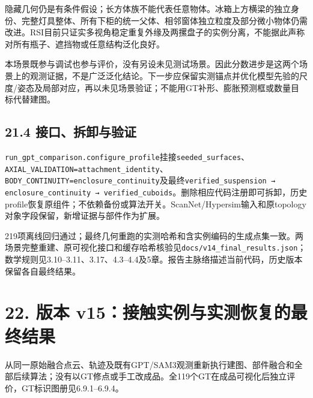 \documentclass[UTF8,fontset=fandol]{ctexart}
\begin{document}
隐藏几何仍是有条件假设；长方体族不能代表任意物体。冰箱上方横梁的独立身份、完整灯具整体、所有下柜的统一父体、相邻窗体独立粒度及部分微小物体仍需改进。RSI目前只证实多视角稳定重复外缘及两摞盘子的实例分离，不能据此声称对所有瓶子、遮挡物或任意结构泛化良好。



本场景既参与调试也参与评价，没有另设未见测试场景。因此分数进步是这两个场景上的观测证据，不是广泛泛化结论。下一步应保留实测锚点并优化模型先验的尺度/姿态及局部对应，再以未见场景验证；不能用GT补形、膨胀预测框或数量目标代替建图。



\subsection*{21.4 接口、拆卸与验证}

\texttt{run\_\allowbreak{}gpt\_\allowbreak{}comparison.\allowbreak{}configure\_\allowbreak{}profile}挂接\texttt{seeded\_\allowbreak{}surfaces}、\texttt{AXIAL\_\allowbreak{}VALIDATION=attachment\_\allowbreak{}identity}、\texttt{BODY\_\allowbreak{}CONTINUITY=enclosure\_\allowbreak{}continuity}及最终\texttt{verified\_\allowbreak{}suspension → enclosure\_\allowbreak{}continuity → verified\_\allowbreak{}cuboids}。删除相应代码注册即可拆卸，历史profile恢复原组件；不依赖备份或算法开关。ScanNet/Hypersim输入和原topology对象字段保留，新增证据与部件作为扩展。



219项离线回归通过；最终几何重跑的实测哈希和含实例编码的生成点集一致。两场景完整重建、原可视化接口和缓存哈希核验见\texttt{docs/\allowbreak{}v14\_\allowbreak{}final\_\allowbreak{}results.\allowbreak{}json}；数学规则见3.10–3.11、3.17、4.3–4.4及5章。报告主脉络描述当前代码，历史版本保留各自最终结果。



\section*{22. 版本 v15：接触实例与实测恢复的最终结果}

从同一原始融合点云、轨迹及既有GPT/SAM3观测重新执行建图、部件融合和全部后续算法；没有以GT修点或手工改成品。全119个GT在成品可视化后独立评价，GT标识图册见6.9.1–6.9.4。
\end{document}
